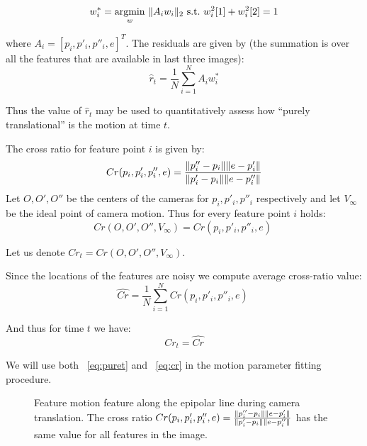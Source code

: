 \documentclass[10pt]{article}         %
\DeclarePairedDelimiter\norm{\lVert}{\rVert}%
\begin{document}
\[
w_i^* = \underset{w}{\text{argmin}} \ \norm{A_iw_i}_2\ \text{s.t.}\
w^2_i[1]+w^2_i[2]=1
\]

where $A_i=[p_i,p'_i,p''_i,e]^T$.  The residuals are given by (the
summation is over all the features that are available in last three
images):
\begin{equation}\label{eq:puret}
  \hat{r}_t = \frac{1}{N} \sum_{i=1}^N A_iw_i^*
\end{equation}

Thus the value of $\hat{r}_t$ may be used to quantitatively assess how
``purely translational'' is the motion at time $t$.

The cross ratio for feature point $i$ is given by:
\[
Cr(p_i,p'_i,p''_i,e) =
\frac{\norm{p''_i-p_i}\norm{e-p'_i}}{\norm{p'_i-p_i}\norm{e-p''_i}}
\]
Let $O,O',O''$ be the centers of the cameras for $p_i,p'_i,p''_i$
respectively and let $V_\infty$ be the ideal point of camera motion.
Thus for every feature point $i$ holds:
\[
Cr(O,O',O'',V_{\infty}) = Cr(p_i,p'_i,p''_i,e) \;
\]

Let us denote $Cr_t = Cr(O,O',O'',V_{\infty})$.

Since the locations of the features are noisy we compute average
cross-ratio value:
\[
\hat{Cr} =  \frac{1}{N}\sum_{i=1}^NCr(p_i,p'_i,p''_i,e) \;
\]

And thus for time $t$ we have:
\begin{equation}\label{eq:cr}
  Cr_t = \hat{Cr}
\end{equation}

We will use both ~\ref{eq:puret} and ~\ref{eq:cr} in the motion
parameter fitting procedure.

\begin{figure}[!h]
  \centering
  \caption{Feature motion feature along the epipolar line during
    camera translation.  The cross ratio $Cr(p_i,p'_i,p''_i,e) =
    \frac{\norm{p''_i-p_i}\norm{e-p'_i}}
    {\norm{p'_i-p_i}\norm{e-p''_i}}$ has the same value for all
    features in the image.}
  \label{fig:cross_ratio}
\end{figure}
\end{document}
